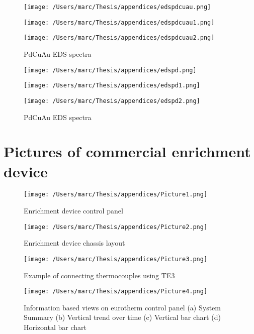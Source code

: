 \begin{figure}[H]
  \texttt{[image: /Users/marc/Thesis/appendices/edspdcuau.png]}
\end{figure}
\begin{figure}[H]
  \texttt{[image: /Users/marc/Thesis/appendices/edspdcuau1.png]}
\end{figure}

\begin{figure}[H]
  \texttt{[image: /Users/marc/Thesis/appendices/edspdcuau2.png]}
  \caption{PdCuAu EDS spectra}
\end{figure}

\begin{figure}[H]
  \texttt{[image: /Users/marc/Thesis/appendices/edspd.png]}
\end{figure}
\begin{figure}[H]
  \texttt{[image: /Users/marc/Thesis/appendices/edspd1.png]}
\end{figure}

\begin{figure}[H]
  \texttt{[image: /Users/marc/Thesis/appendices/edspd2.png]}
  \caption{PdCuAu EDS spectra}
\end{figure}

\chapter{Pictures of commercial enrichment device}

\begin{figure}[H]
    \texttt{[image: /Users/marc/Thesis/appendices/Picture1.png]}
    \caption{Enrichment device control panel}
  \end{figure}

  \begin{figure}[H]
    \texttt{[image: /Users/marc/Thesis/appendices/Picture2.png]}
    \caption{Enrichment device chassis layout}
  \end{figure}

  \begin{figure}[H]
    \texttt{[image: /Users/marc/Thesis/appendices/Picture3.png]}
    \caption{Example of connecting thermocouples using TE3}
  \end{figure}

  \begin{figure}[H]
    \texttt{[image: /Users/marc/Thesis/appendices/Picture4.png]}
    \caption{Information based views on eurotherm control panel (a) System Summary (b) Vertical trend over time (c) Vertical bar chart (d) Horizontal bar chart}
  \end{figure}

